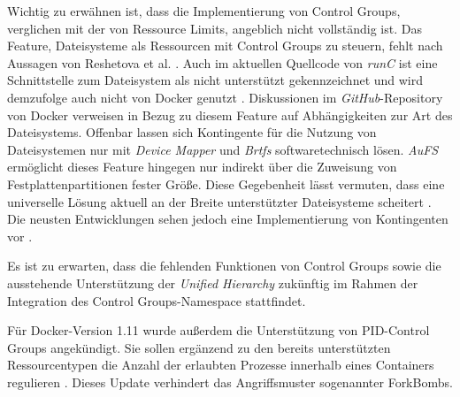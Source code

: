 \documentclass[../main.tex]{subfiles}
\begin{document}
		Wichtig zu erwähnen ist, dass die Implementierung von Control Groups, verglichen mit der von Ressource Limits, angeblich nicht vollständig ist. Das Feature, Dateisysteme als Ressourcen mit Control Groups zu steuern, fehlt nach Aussagen von Reshetova et al. \cite[S.19]{dockerSec2}. Auch im aktuellen Quellcode von \emph{runC} ist eine Schnittstelle zum Dateisystem als \glqq{}nicht unterstützt\grqq{} gekennzeichnet und wird demzufolge auch nicht von Docker genutzt \cite{githubRunCCgroups}. Diskussionen im \emph{GitHub}-Repository von Docker verweisen in Bezug zu diesem Feature auf Abhängigkeiten zur Art des Dateisystems. Offenbar lassen sich Kontingente für die Nutzung von Dateisystemen nur mit \emph{Device Mapper} und \emph{Brtfs} softwaretechnisch lösen. \emph{AuFS} ermöglicht dieses Feature hingegen nur indirekt über die Zuweisung von Festplattenpartitionen fester Größe. Diese Gegebenheit lässt vermuten, dass eine universelle Lösung aktuell an der Breite unterstützter Dateisysteme scheitert \cite{githubDockerIssueFsQuota}. Die neusten Entwicklungen sehen jedoch eine Implementierung von Kontingenten vor \cite{githubDockerPullBrtfs}.

		Es ist zu erwarten, dass die fehlenden Funktionen von Control Groups sowie die ausstehende Unterstützung der \emph{Unified Hierarchy} zukünftig im Rahmen der Integration des Control Groups-Namespace stattfindet.

		Für Docker-Version 1.11 wurde außerdem die Unterstützung von \acrshort{PID}-Control Groups angekündigt. Sie sollen ergänzend zu den bereits unterstützten Ressourcentypen die Anzahl der erlaubten Prozesse innerhalb eines Containers regulieren \cite{githubCgroupPID}\cite{docker110Security}. Dieses Update verhindert das Angriffsmuster sogenannter \glspl{ForkBomb}.


\end{document}
